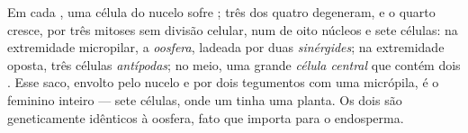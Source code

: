 \begin{proposition}\label{prop:b2:angiosperm-reproduction:embryosac}
Em cada , uma célula  do nucelo sofre ; três dos
quatro  degeneram, e o quarto cresce, por três mitoses sem
divisão celular, num \emph{} de oito núcleos e sete
células: na extremidade micropilar, a \emph{oosfera}, ladeada por duas
\emph{sinérgides}; na extremidade oposta, três células
\emph{antípodas}; no meio, uma grande \emph{célula central} que contém
dois \emph{}. Esse saco, envolto pelo nucelo e por dois
tegumentos com uma micrópila, é o  feminino inteiro --- sete
células, onde um  tinha uma planta. Os dois  são
geneticamente idênticos à oosfera, fato que importa para o endosperma.
\end{proposition}

